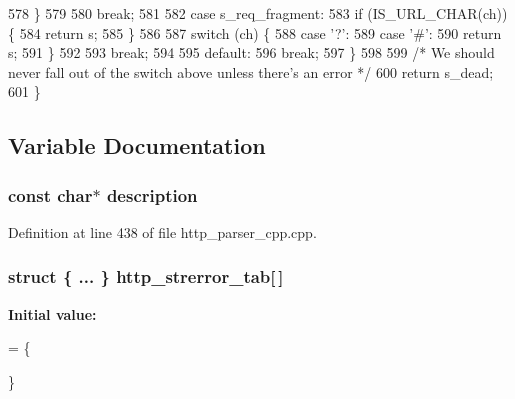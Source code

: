 \begin{DoxyCode}
578       \}
579 
580       \textcolor{keywordflow}{break};
581 
582     \textcolor{keywordflow}{case} s_req_fragment:
583       \textcolor{keywordflow}{if} (IS_URL_CHAR(ch)) \{
584         \textcolor{keywordflow}{return} s;
585       \}
586 
587       \textcolor{keywordflow}{switch} (ch) \{
588         \textcolor{keywordflow}{case} \textcolor{charliteral}{'?'}:
589         \textcolor{keywordflow}{case} \textcolor{charliteral}{'#'}:
590           \textcolor{keywordflow}{return} s;
591       \}
592 
593       \textcolor{keywordflow}{break};
594 
595     \textcolor{keywordflow}{default}:
596       \textcolor{keywordflow}{break};
597   \}
598 
599   \textcolor{comment}{/* We should never fall out of the switch above unless there's an error */}
600   \textcolor{keywordflow}{return} s_dead;
601 \}
\end{DoxyCode}


\subsection{Variable Documentation}
\subsubsection[{description}]{\setlength{\rightskip}{0pt plus 5cm}const char$\ast$ description}\label{http__parser__cpp_8cpp_a68344fa88cf4e86b5079fd69a5c22d57}


Definition at line 438 of file http\+\_\+parser\+\_\+cpp.\+cpp.

\subsubsection[{http\+\_\+strerror\+\_\+tab}]{\setlength{\rightskip}{0pt plus 5cm}struct \{ ... \}   http\+\_\+strerror\+\_\+tab[$\,$]\hspace{0.3cm}{\ttfamily [static]}}\label{http__parser__cpp_8cpp_a3bcf086146208fdbb031ecf50426b004}
{\bfseries Initial value\+:}
\begin{DoxyCode}
= \{

\}
\end{DoxyCode}


